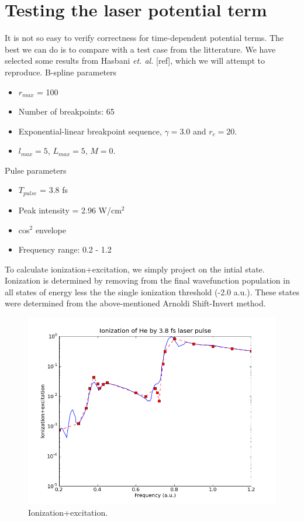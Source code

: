 \documentclass[a4paper,12pt]{article}
\begin{document}
\section{Testing the laser potential term}
It is not so easy to verify correctness for time-dependent potential terms. The best we can do is to compare with a test case from the litterature. We have selected some results from Hasbani \textit{et. al.} [ref], which we will attempt to reproduce.
%
B-spline parameters
\begin{itemize}
	\item $r_{max}$ = 100
	\item Number of breakpoints: 65
	\item Exponential-linear breakpoint sequence, $\gamma = 3.0$ and $r_c = 20$.
	\item $l_{max} = 5$, $L_{max} = 5$, $M = 0$.
\end{itemize}
%
Pulse parameters
\begin{itemize}
	\item $T_{pulse}$ = 3.8 fs
	\item Peak intensity = 2.96 W/cm$^2$
	\item cos$^2$ envelope
	\item Frequency range: 0.2 - 1.2
\end{itemize}

To calculate ionization+excitation, we simply project on the intial state. Ionization is determined by removing from the final wavefunction population in all states of energy less the the single ionization threshold (-2.0 a.u.). These states were determined from the above-mentioned Arnoldi Shift-Invert method.

\begin{figure}[ht]
\begin{center}
	\includegraphics[width=\textwidth]{hasbani_pyprop2e_ionization_excitation.png}
\end{center}
\caption{Ionization+excitation.}
\end{figure}
\end{document}
